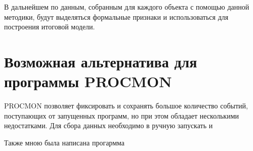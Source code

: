 В дальнейшем по данным, собранным для каждого объекта с помощью данной методики, будут выделяться формальные признаки и использоваться для построения итоговой модели.

\section{Возможная альтернатива для программы PROCMON}

PROCMON позволяет фиксировать и сохранять большое количество событий, поступающих от запущенных программ, но при этом обладает несколькими недостатками.
Для сбора данных необходимо в ручную запускать и  

Также мною была написана прогармма